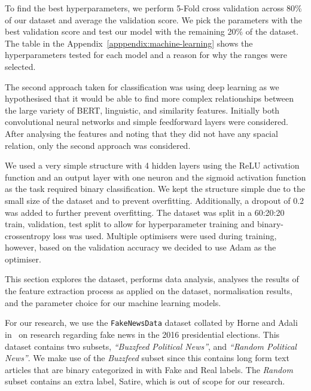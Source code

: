 \documentclass{article}
\begin{document}
To find the best hyperparameters, we perform 5-Fold cross validation across 80\% of our dataset and average the validation score. We pick the parameters with the best validation score and test our model with the remaining 20\% of the dataset. The table in the Appendix~\ref{apppendix:machine-learning} shows the hyperparameters tested for each model and a reason for why the ranges were selected.


The second approach taken for classification was using deep learning as we hypothesised that it would be able to find more complex relationships between the large variety of BERT, linguistic, and similarity features. Initially both convolutional neural networks and simple feedforward layers were considered. After analysing the features and noting that they did not have any spacial relation, only the second approach was considered.

We used a very simple structure with 4 hidden layers using the ReLU activation function and an output layer with one neuron and the sigmoid activation function as the task required binary classification. We kept the structure simple due to the small size of the dataset and to prevent overfitting. Additionally, a dropout of 0.2 was added to further prevent overfitting. The dataset was split in a 60:20:20 train, validation, test split to allow for hyperparameter training and binary-crossentropy loss was used. Multiple optimisers were used during training, however, based on the validation accuracy we decided to use Adam as the optimiser.

\label{section:experimental-setup}
This section explores the dataset, performs data analysis, analyses the results of the feature extraction process as applied on the dataset, normalisation results, and the parameter choice for our machine learning models.

\label{section:dataset}

For our research, we use the \verb|FakeNewsData| dataset collated by Horne and Adali in~\cite{horne2017} on research regarding fake news in the 2016 presidential elections. This dataset contains two subsets, \emph{``Buzzfeed Political News''}, and \emph{``Random Political News''}. We make use of the \emph{Buzzfeed} subset since this contains long form text articles that are binary categorized in with Fake and Real labels. The \emph{Random} subset contains an extra label, Satire, which is out of scope for our research.
\end{document}
